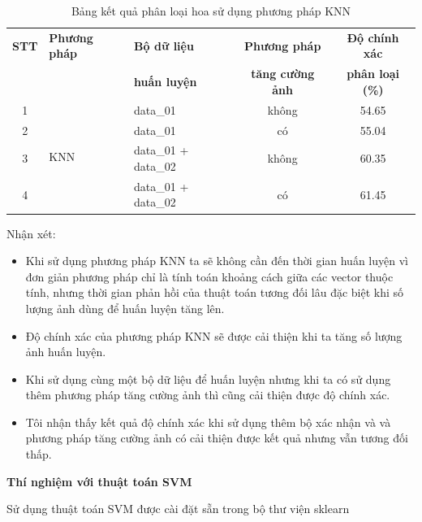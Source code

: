 \documentclass[12pt]{report}
\begin{document}
		\begin{table}[h]
			\centering
			\caption{Bảng kết quả phân loại hoa sử dụng phương pháp KNN}
			\label{tbl:table ket qua cua KNN}
			\begin{tabular}{|c|l|l|c|c|}
				\hline
				\textbf{STT} & \textbf{Phương pháp} & \textbf{Bộ dữ liệu} & \textbf{Phương pháp}       & \textbf{Độ chính xác} \\ 
				             &                         & \textbf{huấn luyện}   & \textbf{tăng cường ảnh} & \textbf{phân loại (\%)} \\ \hline
				1            & \multirow{4}{*}{KNN}    & data\_01                  & không                        & 54.65                      \\ \cline{1-1} \cline{3-5}
				2            &                         & data\_01                  & có                           & 55.04                      \\ \cline{1-1}\cline{3-5}
				3            &                         & data\_01 + data\_02       & không                        & 60.35                      \\ \cline{1-1}\cline{3-5}
				4            &                         & data\_01 + data\_02       & có                           & 61.45                      \\ \hline
			\end{tabular}
		\end{table}
		Nhận xét: 		
		\begin{itemize}
			\item Khi sử dụng phương pháp KNN ta sẽ không cần đến thời gian huấn luyện vì đơn giản phương pháp chỉ là tính toán khoảng cách giữa các vector thuộc tính, nhưng thời gian phản hồi của thuật toán tương đối lâu đặc biệt khi số lượng ảnh dùng để huấn luyện tăng lên.
			\item Độ chính xác của phương pháp KNN sẽ được cải thiện khi ta tăng số lượng ảnh huấn luyện.
			\item Khi sử dụng cùng một bộ dữ liệu để huấn luyện nhưng khi ta có sử dụng thêm phương pháp tăng cường ảnh thì cũng cải thiện được độ chính xác.
			\item Tôi nhận thấy kết quả độ chính xác khi sử dụng thêm bộ xác nhận và và phương pháp tăng cường ảnh có cải thiện được kết quả nhưng vẫn tương đối thấp.
		\end{itemize}
				
		\textbf{Thí nghiệm với thuật toán SVM}

		Sử dụng thuật toán SVM được cài đặt sẵn trong bộ thư viện sklearn
\end{document}
